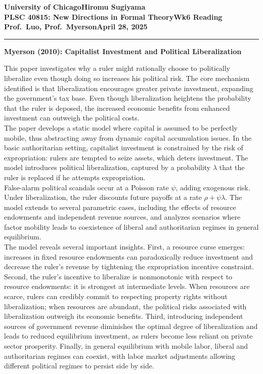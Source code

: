 \documentclass[10pt]{article}    %
\newcommand{\myname}{Hiromu Sugiyama}
\newcommand{\assignment}{Wk6 Reading}
\newcommand{\duedate}{April 28, 2025}
\begin{document}
\textbf{University of Chicago}\hfill\textbf{\myname}\\[0.01in]
\textbf{PLSC 40815: New Directions in Formal Theory}\hfill\textbf{\assignment}\\[0.01in]
\textbf{Prof.\ Luo, Prof.\ Myerson}\hfill\textbf{\duedate}\\
\smallskip\hrule\bigskip

\textbf{Myerson (2010): Capitalist Investment and Political Liberalization} \par
This paper investigates why a ruler might rationally choose to politically liberalize even though doing so increases his political risk. The core mechanism identified is that liberalization encourages greater private investment, expanding the government's tax base. Even though liberalization heightens the probability that the ruler is deposed, the increased economic benefits from enhanced investment can outweigh the political costs. \\
The paper develops a static model where capital is assumed to be perfectly mobile, thus abstracting away from dynamic capital accumulation issues. In the basic authoritarian setting, capitalist investment is constrained by the risk of expropriation: rulers are tempted to seize assets, which deters investment. The model introduces political liberalization, captured by a probability $\lambda$ that the ruler is replaced if he attempts expropriation. \\
False-alarm political scandals occur at a Poisson rate $\psi$, adding exogenous risk. Under liberalization, the ruler discounts future payoffs at a rate $\rho + \psi \lambda$. The model extends to several parametric cases, including the effects of resource endowments and independent revenue sources, and analyzes scenarios where factor mobility leads to coexistence of liberal and authoritarian regimes in general equilibrium.\\
The model reveals several important insights. First, a resource curse emerges: increases in fixed resource endowments can paradoxically reduce investment and decrease the ruler's revenue by tightening the expropriation incentive constraint. Second, the ruler's incentive to liberalize is nonmonotonic with respect to resource endowments: it is strongest at intermediate levels. When resources are scarce, rulers can credibly commit to respecting property rights without liberalization; when resources are abundant, the political risks associated with liberalization outweigh its economic benefits. Third, introducing independent sources of government revenue diminishes the optimal degree of liberalization and leads to reduced equilibrium investment, as rulers become less reliant on private sector prosperity. Finally, in general equilibrium with mobile labor, liberal and authoritarian regimes can coexist, with labor market adjustments allowing different political regimes to persist side by side.\\
\end{document}
